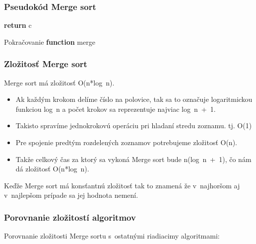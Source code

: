 \documentclass[10pt,xcolor=pdflatex,hyperref={unicode}]{beamer}
\begin{document}
\begin{frame}
\frametitle{Pseudokód Merge sort}
\begin{algorithm}[H]
\NoCaptionOfAlgo
\DontPrintSemicolon
\setcounter{AlgoLine}{10}
    \;
    \;
    \textbf{return} c\;
    \caption{Pokračovanie \textbf{function} merge}
\end{algorithm}
\end{frame}

\begin{frame}
\frametitle{Zložitosť Merge sort}
    Merge sort má zložitosť \alert{O(n*log~n)}.
    \begin{itemize}
        \item Ak každým krokom delíme číslo na polovice, tak sa to označuje logaritmickou funkciou \alert{log~n} a počet krokov sa reprezentuje najviac \alert{log~n~+~1}.
        \item Takisto spravíme jednokrokovú operáciu pri hladaní stredu zoznamu. tj. \alert{O(1)}
        \item Pre spojenie predtým rozdelených zoznamov potrebujeme zložitosť \alert{O(n)}.
        \item Takže celkový čas za ktorý sa vykoná Merge sort bude \alert{n(log~n~+~1)}, čo nám dá zložitosť \alert{O(n*log~n)}.
    \end{itemize}
    Keďže Merge sort má konsťantnú zložitosť tak to znamená že v~najhoršom aj v~najlepšom prípade sa jej hodnota nemení.
\end{frame}

\begin{frame}
\frametitle{Porovnanie zložitostí algoritmov}
Porovnanie zložitosti Merge sortu s~ostatnými riadiacimy algoritmami:
\begin{center}
\end{center}
\end{frame}
\end{document}
